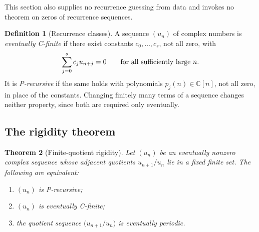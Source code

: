 \documentclass[11pt,letterpaper]{article}
\numberwithin{equation}{section}
\newtheorem{theorem}{Theorem}[section]
\theoremstyle{definition}
\newtheorem{definition}[theorem]{Definition}
\theoremstyle{remark}
\newcommand{\C}{\mathbb{C}}
\begin{document}
This section also supplies no recurrence guessing from data and invokes no
theorem on zeros of recurrence sequences.

\begin{definition}[Recurrence classes]\label{def:recurrences}
A sequence $(u_n)$ of complex numbers is \emph{eventually C-finite} if there
exist constants $c_0,\ldots,c_s$, not all zero, with
\[
 \sum_{j=0}^s c_ju_{n+j}=0
 \qquad\hbox{for all sufficiently large }n.
\]
It is \emph{P-recursive} if the same holds with polynomials $p_j(n)\in\C[n]$,
not all zero, in place of the constants. Changing finitely many terms of a
sequence changes neither property, since both are required only eventually.
\end{definition}

\subsection{The rigidity theorem}
\begin{theorem}[Finite-quotient rigidity]\label{thm:rigidity}
Let $(u_n)$ be an eventually nonzero complex sequence whose adjacent
quotients $u_{n+1}/u_n$ lie in a fixed finite set. The following are
equivalent:
\begin{enumerate}[label=\textup{(\roman*)},leftmargin=2.4em]
\item $(u_n)$ is P-recursive;
\item $(u_n)$ is eventually C-finite;
\item the quotient sequence $\bigl(u_{n+1}/u_n\bigr)$ is eventually periodic.
\end{enumerate}
\end{theorem}
\end{document}
